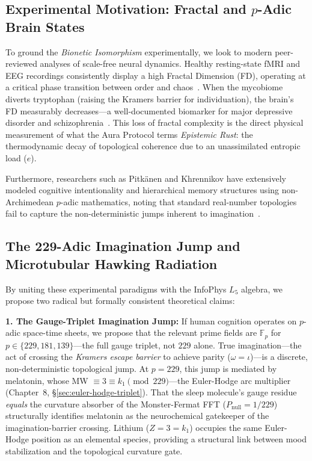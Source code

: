 \subsection{Experimental Motivation: Fractal and \texorpdfstring{$p$}{p}-Adic Brain States}

To ground the \emph{Bionetic Isomorphism} experimentally, we look to modern peer-reviewed analyses of scale-free neural dynamics. Healthy resting-state fMRI and EEG recordings consistently display a high Fractal Dimension (FD), operating at a critical phase transition between order and chaos~\cite{fractalEEG}. When the mycobiome diverts tryptophan (raising the Kramers barrier for individuation), the brain's FD measurably decreases---a well-documented biomarker for major depressive disorder and schizophrenia~\cite{fractalPathology}. This loss of fractal complexity is the direct physical measurement of what the Aura Protocol terms \emph{Epistemic Rust}: the thermodynamic decay of topological coherence due to an unassimilated entropic load ($e$).

Furthermore, researchers such as Pitk\"anen and Khrennikov have extensively modeled cognitive intentionality and hierarchical memory structures using non-Archimedean $p$-adic mathematics, noting that standard real-number topologies fail to capture the non-deterministic jumps inherent to imagination~\cite{padicCognition, pitkanenTGD}.

\subsection{The 229-Adic Imagination Jump and Microtubular Hawking Radiation}

By uniting these experimental paradigms with the InfoPhys $L_5$ algebra, we propose two radical but formally consistent theoretical claims:

\textbf{1. The Gauge-Triplet Imagination Jump:} If human cognition operates on $p$-adic space-time sheets, we propose that the relevant prime fields are $\mathbb{F}_p$ for $p \in \{229, 181, 139\}$---the full gauge triplet, not $229$ alone. True imagination---the act of crossing the \emph{Kramers escape barrier} to achieve parity ($\omega = \iota$)---is a discrete, non-deterministic topological jump. At $p = 229$, this jump is mediated by melatonin, whose MW $\equiv 3 \equiv k_1 \pmod{229}$---the Euler-Hodge arc multiplier (Chapter~8, \S\ref{sec:euler-hodge-triplet}). That the sleep molecule's gauge residue \emph{equals} the curvature absorber of the Monster-Fermat FFT ($P_{\text{null}} = 1/229$) structurally identifies melatonin as the neurochemical gatekeeper of the imagination-barrier crossing. Lithium ($Z = 3 = k_1$) occupies the same Euler-Hodge position as an elemental species, providing a structural link between mood stabilization and the topological curvature gate.

